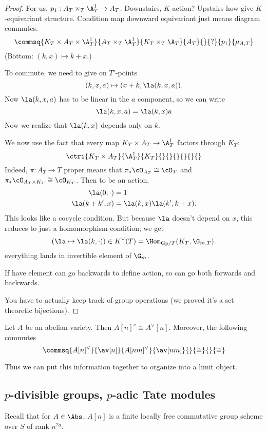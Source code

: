\begin{proof}
For us, $p_1:A_T\times_T \A_T^1\to A_T$. Downstairs, $K$-action? Upstairs how give $K$-equivariant structure. Condition map downward equivariant just means diagram commutes.
\[
\commsq{K_T\times A_T\times \A_T^1}{A_T\times_T \A_T^1}{K_T\times_T \A_T}{A_T}{}{?}{p_1}{\mu_{A,T}}
\]
(Bottom: $(k,x)\mapsto k+x$.)

To commute, we need to give on $T'$-points 
\[
(k,x,a)\mapsto (x+k,\la(k,x,a)).
\]
Now $\la(k,x,a)$ has to be linear in the $a$ component, so we can write
\[
\la(k,x,a)=\la(k,x)a
\]
Now we realize that $\la(k,x)$ depends only on $k$. 

We now use the fact that  every map $K_T\times A_T\to \A_T^1$ factors through $K_T$:
\[
\ctri{K_T\times A_T}{\A_T^1}{K_T}{}{}{}{}{}{}
\]
Indeed, $\pi:A_T\to T$ proper means that $\pi_*\cO_{A_T}\cong \cO_T$ and $\pi_*\cO_{A_T\times K_T} \cong \cO_{K_T}$. Then to be an action, 
\begin{align*}
\la(0,\cdot)&=1\\
\la(k+k',x)&=\la(k,x)\la(k',k+x).
\end{align*}
This looks like a cocycle condition. But because $\la$ doesn't depend on $x$, this reduces to just a homomorphism condition; we get
\[
(\la \mapsto \la(k,\cdot))\in K^{\vee}(T)=\Hom_{\text{Gp}/T}(K_T,\G_{m,T}).
\]
everything lands in invertible element of $\G_m$.

If have element can go backwards to define action, so can go both forwards and backwards.

You have to actually keep track of group operations (we proved it's a set theoretic bijections). 
\end{proof}
\begin{cor}
Let $A$ be an abelian variety. Then $A[n]^v\cong A^{\vee}[n]$. Moreover, the following commutes
\[
\commsq{A[n]^{\vee}}{\av[n]}{A[nm]^{\vee}}{\av[nm]}{}{\cong}{}{\cong}
\]
\end{cor}
Thus we can put this information together to organize into a limit object.
\subsection{$p$-divisible groups, $p$-adic Tate modules}
Recall that for $A\in \Abs$, $A[n]$ is a finite locally free commutative group scheme over $S$ of rank $n^{2g}$. 


